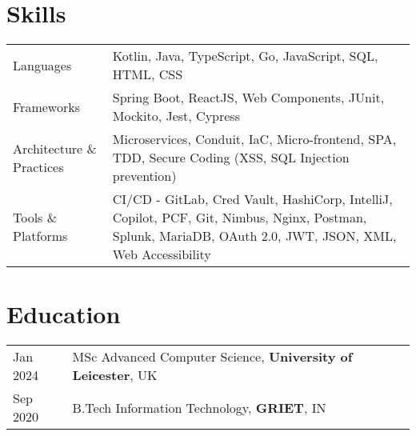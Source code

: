 \documentclass[a4paper,12pt]{article}
\begin{document}
\section{Skills}
\begin{tabularx}{\linewidth}{@{}l X@{}}
Languages & Kotlin, Java, TypeScript, Go, JavaScript, SQL, HTML, CSS\\
Frameworks & Spring Boot, ReactJS, Web Components, JUnit, Mockito, Jest, Cypress\\
Architecture \& Practices & Microservices, Conduit, IaC, Micro-frontend, SPA, TDD, Secure Coding (XSS, SQL Injection prevention) \\
Tools \& Platforms & CI/CD - GitLab, Cred Vault, HashiCorp, IntelliJ, Copilot, PCF, Git, Nimbus, Nginx, Postman, Splunk, MariaDB, OAuth 2.0, JWT, JSON, XML, Web Accessibility \\
\end{tabularx}
\section{Education}
\begin{tabularx}{\linewidth}{@{}l X@{}} 	
Jan 2024 & MSc Advanced Computer Science, \textbf{University of Leicester}, UK \\
Sep 2020 & B.Tech Information Technology, \textbf{GRIET}, IN \\
\end{tabularx}
\end{document}
